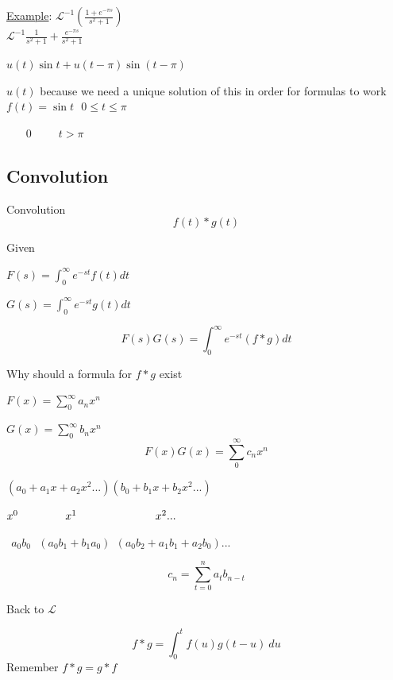 \documentclass[12pt]{article}
\numberwithin{equation}{subsection}
\newcommand{\lap}{\mathscr{L}}
\newcommand{\sinp}[1]{\sin\left( #1 \right)}
\newcommand{\inda}{\hspace{.5cm}}
\newcommand{\indb}{\hspace{1cm}}
\newcommand{\indc}{\hspace{1.5cm}}
\newcommand{\indd}{\hspace{2cm}}
\newcommand{\inde}{\hspace{2.5cm}}
\newcommand{\indf}{\hspace{3cm}}
\newcommand{\indu}{\hspace{10.5cm}}
\newcommand{\exa}{\noindent \underline{Example}: \hspace{1cm}}
\begin{document}
 \exa $\displaystyle \lap^{-1}\left(\frac{1+e^{-\pi s}}{s^2+1}\right)$\\
 
\indd $\lap^{-1} \frac{1}{s^2+1}+ \frac{e^{-\pi s}}{s^2+1}$
 
\indd $u(t)\sin t + u(t-\pi)\sinp{t-\pi}$ 
 
\indd $u(t)$ because we need a unique solution of this in order for formulas to work\\
 
\indb $f(t)=\sin t \ \ \ 0\leq t \leq \pi$
 
 \indb $\  \ \ \ \ \ \ \ 0 \ \ \ \ \  \ \ \ \ \ \ t > \pi$

 \newpage
\subsection{Convolution}
 
 \inda Convolution 
 \begin{equation}
 f(t) * g(t)
 \end{equation}
 
 Given
 
 $\displaystyle F(s) = \int_0^\infty e^{-st} f(t)dt$
 
 $\displaystyle G(s) = \int_0^\infty e^{-st} g(t)dt$
 
 
 \begin{equation}
 F(s)G(s)=\int_0^\infty e^{-st}(f*g)dt
 \end{equation}
 
 Why should a formula for $f*g$ exist
 
 $\displaystyle F(x) = \sum_0^\infty a_n x^n$
 
 $\displaystyle G(x) = \sum_0^\infty b_n x^n$
\begin{equation}
F(x)G(x)=\sum_0^\infty c_n x^n
\end{equation}

\indd $(a_0 + a_1x + a_2x^2 ...)(b_0 + b_1x + b_2x^2 ...)$

\indf $x^0 \indc x^1 \inde x^2 ...$

\inde $\ \ a_0b_0\ \ \ (a_0b_1+b_1a_0)\ \ (a_0b_2+a_1b_1+a_2b_0)...$

\begin{equation}
c_n=\sum_{t=0}^n a_tb_{n-t}
\end{equation}

Back to $\lap$

\begin{equation}
f*g = \int_0^t f(u)g(t-u)\ du
\end{equation}
\indu Remember $f*g=g*f$\\
\end{document}
